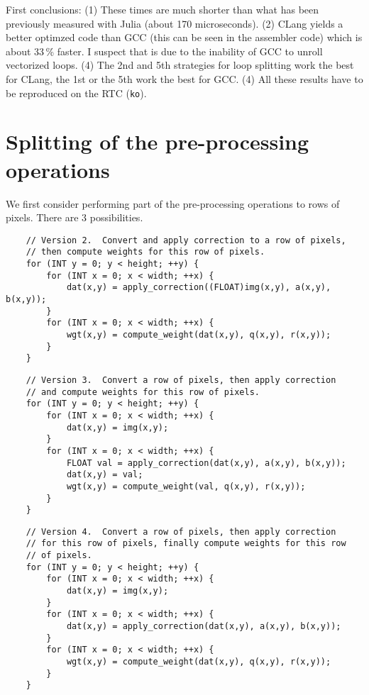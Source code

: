 \documentclass[10pt]{article}
\begin{document}
First conclusions: (1) These times are much shorter than what has been
previously measured with Julia (about 170 microseconds). (2) CLang
yields a better optimzed code than GCC (this can be seen in the
assembler code) which is about 33\,\% faster.  I suspect that is due
to the inability of GCC to unroll vectorized loops.  (4) The 2nd and
5th strategies for loop splitting work the best for CLang, the 1st or
the 5th work the best for GCC. (4) All these results have to be
reproduced on the RTC (\verb+ko+).

\appendix
\section{Splitting of the pre-processing operations}
\label{sec:split-pre-processing}

We first consider performing part of the pre-processing operations
to rows of pixels.  There are 3 possibilities.
\begin{verbatim}
    // Version 2.  Convert and apply correction to a row of pixels,
    // then compute weights for this row of pixels.
    for (INT y = 0; y < height; ++y) {
        for (INT x = 0; x < width; ++x) {
            dat(x,y) = apply_correction((FLOAT)img(x,y), a(x,y), b(x,y));
        }
        for (INT x = 0; x < width; ++x) {
            wgt(x,y) = compute_weight(dat(x,y), q(x,y), r(x,y));
        }
    }
\end{verbatim}

\begin{verbatim}
    // Version 3.  Convert a row of pixels, then apply correction
    // and compute weights for this row of pixels.
    for (INT y = 0; y < height; ++y) {
        for (INT x = 0; x < width; ++x) {
            dat(x,y) = img(x,y);
        }
        for (INT x = 0; x < width; ++x) {
            FLOAT val = apply_correction(dat(x,y), a(x,y), b(x,y));
            dat(x,y) = val;
            wgt(x,y) = compute_weight(val, q(x,y), r(x,y));
        }
    }
\end{verbatim}

\begin{verbatim}
    // Version 4.  Convert a row of pixels, then apply correction
    // for this row of pixels, finally compute weights for this row
    // of pixels.
    for (INT y = 0; y < height; ++y) {
        for (INT x = 0; x < width; ++x) {
            dat(x,y) = img(x,y);
        }
        for (INT x = 0; x < width; ++x) {
            dat(x,y) = apply_correction(dat(x,y), a(x,y), b(x,y));
        }
        for (INT x = 0; x < width; ++x) {
            wgt(x,y) = compute_weight(dat(x,y), q(x,y), r(x,y));
        }
    }
\end{verbatim}
\end{document}
